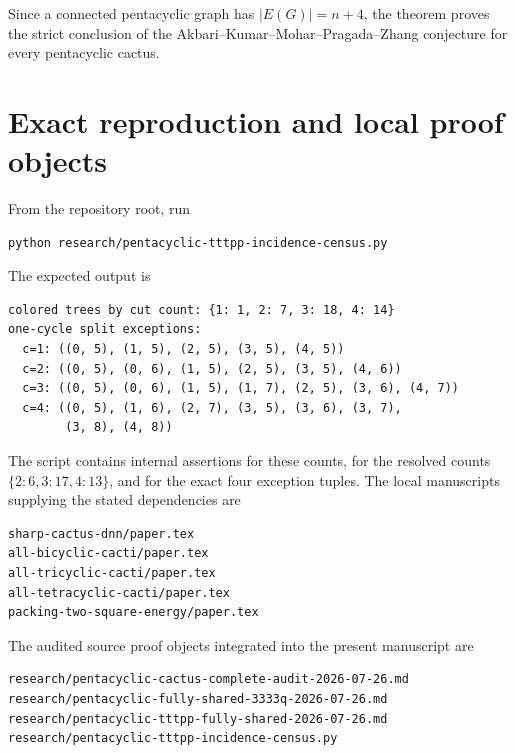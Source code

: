\documentclass[11pt]{article}
\begin{document}
Since a connected pentacyclic graph has $|E(G)|=n+4$, the theorem proves the
strict conclusion of the Akbari--Kumar--Mohar--Pragada--Zhang conjecture
\cite[Conjecture~1.2]{AKMPZ} for every pentacyclic cactus.

\appendix
\section{Exact reproduction and local proof objects}

From the repository root, run
\begin{verbatim}
python research/pentacyclic-tttpp-incidence-census.py
\end{verbatim}
The expected output is
\begin{verbatim}
colored trees by cut count: {1: 1, 2: 7, 3: 18, 4: 14}
one-cycle split exceptions:
  c=1: ((0, 5), (1, 5), (2, 5), (3, 5), (4, 5))
  c=2: ((0, 5), (0, 6), (1, 5), (2, 5), (3, 5), (4, 6))
  c=3: ((0, 5), (0, 6), (1, 5), (1, 7), (2, 5), (3, 6), (4, 7))
  c=4: ((0, 5), (1, 6), (2, 7), (3, 5), (3, 6), (3, 7),
        (3, 8), (4, 8))
\end{verbatim}
The script contains internal assertions for these counts, for the resolved
counts $\{2:6,3:17,4:13\}$, and for the exact four exception tuples.  The
local manuscripts supplying the stated dependencies are
\begin{verbatim}
sharp-cactus-dnn/paper.tex
all-bicyclic-cacti/paper.tex
all-tricyclic-cacti/paper.tex
all-tetracyclic-cacti/paper.tex
packing-two-square-energy/paper.tex
\end{verbatim}
The audited source proof objects integrated into the present manuscript are
\begin{verbatim}
research/pentacyclic-cactus-complete-audit-2026-07-26.md
research/pentacyclic-fully-shared-3333q-2026-07-26.md
research/pentacyclic-tttpp-fully-shared-2026-07-26.md
research/pentacyclic-tttpp-incidence-census.py
\end{verbatim}
\end{document}
